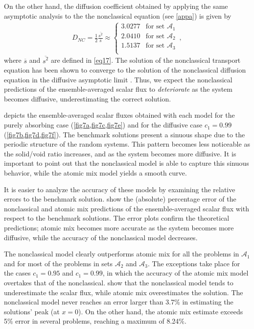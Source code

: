 \documentclass[12pt]{article}
\newcommand{\seta}{\mathcal{A}}
\begin{document}
{On the other hand, the diffusion coefficient obtained by applying the same asymptotic analysis to the the nonclassical equation (see \cref{appa}) is given by 
\begin{align}\label{eq25}
D_{NC} = \frac{1}{2}\frac{\overline{s^2}}{\overline{s}} \approx 
\left\{
\begin{array}{cl}
3.0277 & \text{for set $\seta_1$}\\
2.0410 & \text{for set $\seta_2$}\\
1.5137 & \text{for set $\seta_3$}\\
\end{array}
\right . \, ,
\end{align}  
where $\overline{s}$ and $\overline{s^2}$ are defined in \cref{eq17}. The solution of the nonclassical transport equation has been shown to converge to the solution of the nonclassical diffusion equation in the diffusive asymptotic limit \cite{ans16}. Thus, we expect the nonclassical predictions of the ensemble-averaged scalar flux to {\em deteriorate} as the system becomes diffusive, underestimating the correct solution.

 depicts the ensemble-averaged scalar fluxes obtained with each model for the purely absorbing case (\cref{fig7a,fig7c,fig7e}) and for the diffusive case $c_1=0.99$ (\cref{fig7b,fig7d,fig7f}). The benchmark solutions present a sinuous shape due to the periodic structure of the random systems. This pattern becomes less noticeable as the solid/void ratio increases, and as the system becomes more diffusive. It is important to point out that the
nonclassical model is able to capture this sinuous behavior, while the atomic mix model yields a smooth curve.

It is easier to analyze the accuracy of these models by examining the relative errors to the benchmark solution.  show the (absolute) percentage error of the nonclassical and atomic mix predictions of the ensemble-averaged scalar flux with respect to the benchmark solutions. The error plots confirm the theoretical predictions; atomic mix becomes more accurate as the system becomes more diffusive, while the accuracy of the nonclassical model decreases.

The nonclassical model clearly outperforms atomic mix for all the problems in $\seta_1$ and for most of the problems in sets $\seta_2$ and $\seta_3$. The exceptions take place for the cases $c_1=0.95$ and $c_1=0.99$, in which the accuracy of the atomic mix model overtakes that of the nonclassical.  show that the nonclassical model tends to
underestimate the scalar flux, while atomic mix overestimates the solution. The nonclassical model never reaches an error larger than 3.7\% in estimating the solutions' peak (at $x=0$). On the other hand, the atomic mix estimate exceeds 5\% error in several problems, reaching a maximum of 8.24\%.

}
\end{document}
